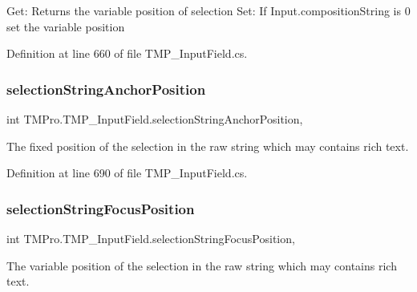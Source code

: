Get\+: Returns the variable position of selection Set\+: If Input.\+composition\+String is 0 set the variable position 



Definition at line 660 of file T\+M\+P\+\_\+\+Input\+Field.\+cs.

\mbox{\label{class_t_m_pro_1_1_t_m_p___input_field_ac36ae4cd4a58fa36661b49928217875e}} 
\subsubsection{\texorpdfstring{selectionStringAnchorPosition}{selectionStringAnchorPosition}}
{\footnotesize\ttfamily int T\+M\+Pro.\+T\+M\+P\+\_\+\+Input\+Field.\+selection\+String\+Anchor\+Position\hspace{0.3cm}{\ttfamily [get]}, {\ttfamily [set]}}



The fixed position of the selection in the raw string which may contains rich text. 



Definition at line 690 of file T\+M\+P\+\_\+\+Input\+Field.\+cs.

\mbox{\label{class_t_m_pro_1_1_t_m_p___input_field_abfe0c449ec61505b163eb5949a09f9ff}} 
\subsubsection{\texorpdfstring{selectionStringFocusPosition}{selectionStringFocusPosition}}
{\footnotesize\ttfamily int T\+M\+Pro.\+T\+M\+P\+\_\+\+Input\+Field.\+selection\+String\+Focus\+Position\hspace{0.3cm}{\ttfamily [get]}, {\ttfamily [set]}}



The variable position of the selection in the raw string which may contains rich text. 



